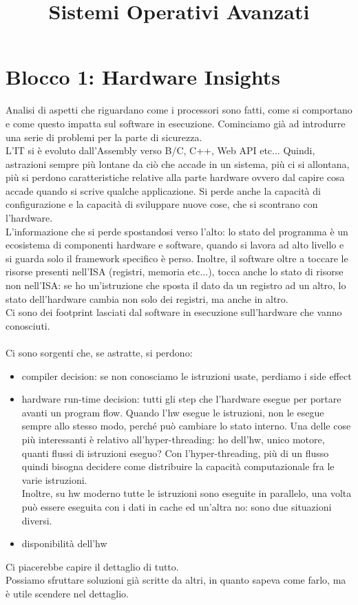 \documentclass[14pt]{article}
\title{Sistemi Operativi Avanzati}
\begin{document}
\maketitle
\tableofcontents
\section{Blocco 1: Hardware Insights}
Analisi di aspetti che riguardano come i processori sono fatti, come si comportano e come questo impatta sul software in esecuzione. Cominciamo già ad introdurre una serie di problemi per la parte di sicurezza.\\ L'IT si è evoluto dall'Assembly verso B/C, C++, Web API etc... Quindi, astrazioni sempre più lontane da ciò che accade in un sistema, più ci si allontana, più si perdono caratteristiche relative alla parte hardware ovvero dal capire cosa accade quando si scrive qualche applicazione. Si perde anche la capacità di configurazione e la capacità di sviluppare nuove cose, che si scontrano con l'hardware.\\ L'informazione che si perde spostandosi verso l'alto: lo stato del programma è un ecosistema di componenti hardware e software, quando si lavora ad alto livello e si guarda solo il framework specifico è perso. Inoltre, il software oltre a toccare le risorse presenti nell'ISA (registri, memoria etc...), tocca anche lo stato di risorse non nell'ISA: se ho un'istruzione che sposta il dato da un registro ad un altro, lo stato dell'hardware cambia non solo dei registri, ma anche in altro.\\ Ci sono dei footprint lasciati dal software in esecuzione sull'hardware che vanno conosciuti.\\\\ Ci sono sorgenti che, se astratte, si perdono:
\begin{itemize}
\item compiler decision: se non conosciamo le istruzioni usate, perdiamo i side effect
\item hardware run-time decision: tutti gli step che l'hardware esegue per portare avanti un program flow. Quando l'hw esegue le istruzioni, non le esegue sempre allo stesso modo, perché può cambiare lo stato interno. Una delle cose più interessanti è relativo all'hyper-threading: ho dell'hw, unico motore, quanti flussi di istruzioni eseguo? Con l'hyper-threading, più di un flusso quindi bisogna decidere come distribuire la capacità computazionale fra le varie istruzioni. \\ Inoltre, su hw moderno tutte le istruzioni sono eseguite in parallelo, una volta può essere eseguita con i dati in cache ed un'altra no: sono due situazioni diversi.
\item disponibilità dell'hw
\end{itemize}
Ci piacerebbe capire il dettaglio di tutto.\\ Possiamo sfruttare soluzioni già scritte da altri, in quanto sapeva come farlo, ma è utile scendere nel dettaglio. \\\\ 
\end{document}
